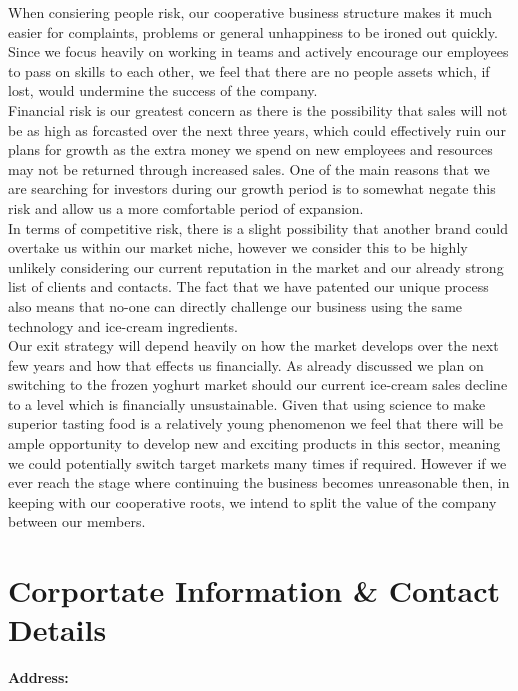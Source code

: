 \documentclass{article}
\begin{document}
When consiering people risk, our cooperative business structure makes it much easier for complaints, problems or general unhappiness to be ironed out quickly. Since we focus heavily on working in teams and actively encourage our employees to pass on skills to each other, we feel that there are no people assets which, if lost, would undermine the success of the company. \\

Financial risk is our greatest concern as there is the possibility that sales will not be as high as forcasted over the next three years, which could effectively ruin our plans for growth as the extra money we spend on new employees and resources may not be returned through increased sales. One of the main reasons that we are searching for investors during our growth period is to somewhat negate this risk and allow us a more comfortable period of expansion. \\

In terms of competitive risk, there is a slight possibility that another brand could overtake us within our market niche, however we consider this to be highly unlikely considering our current reputation in the market and our already strong list of clients and contacts. The fact that we have patented our unique process also means that no-one can directly challenge our business using the same technology and ice-cream ingredients. \\

Our exit strategy will depend heavily on how the market develops over the next few years and how that effects us financially. As already discussed we plan on switching to the frozen yoghurt market should our current ice-cream sales decline to a level which is financially unsustainable. Given that using science to make superior tasting food is a relatively young phenomenon we feel that there will be ample opportunity to develop new and exciting products in this sector, meaning we could potentially switch target markets many times if required. However if we ever reach the stage where continuing the business becomes unreasonable then, in keeping with our cooperative roots, we intend to split the value of the company between our members.

\section{Corportate Information \& Contact Details}

\bf{Address:} \\
\end{document}
